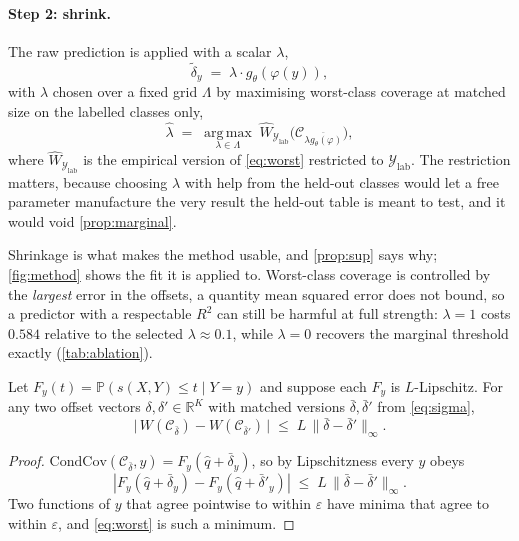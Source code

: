 \paragraph{Step 2: shrink.} The raw prediction is applied with a scalar $\lambda$,
\begin{equation}
\tilde\delta_y \;=\; \lambda\cdot g_\theta(\varphi(y)) ,
\label{eq:shrink}
\end{equation}
with $\lambda$ chosen over a fixed grid $\Lambda$ by maximising worst-class coverage at
matched size on the labelled classes only,
\begin{equation}
\hat\lambda \;=\; \operatorname*{arg\,max}_{\lambda\in\Lambda}\;
\widehat W_{\mathcal{Y}_{\mathrm{lab}}}\bigl(\mathcal{C}_{\overline{\lambda g_\theta(\varphi)}}\bigr),
\label{eq:lambda}
\end{equation}
where $\widehat W_{\mathcal{Y}_{\mathrm{lab}}}$ is the empirical version of \cref{eq:worst}
restricted to $\mathcal{Y}_{\mathrm{lab}}$. The restriction matters, because choosing
$\lambda$ with help from the held-out classes would let a free parameter manufacture the very
result the held-out table is meant to test, and it would void \cref{prop:marginal}.

Shrinkage is what makes the method usable, and \cref{prop:sup} says why;
\cref{fig:method} shows the fit it is applied to. Worst-class
coverage is controlled by the \emph{largest} error in the offsets, a quantity mean squared
error does not bound, so a predictor with a respectable $R^2$ can still be harmful at full
strength: $\lambda=1$ costs $0.584$ relative to the selected $\lambda\approx0.1$, while
$\lambda=0$ recovers the marginal threshold exactly (\cref{tab:ablation}).

\begin{proposition}
\label{prop:sup}
Let $F_y(t)=\mathbb{P}(s(X,Y)\le t\mid Y=y)$ and suppose each $F_y$ is $L$-Lipschitz. For any
two offset vectors $\delta,\delta'\in\mathbb{R}^{K}$ with matched versions
$\bar\delta,\bar\delta'$ from \cref{eq:sigma},
\begin{equation}
\bigl|\,W(\mathcal{C}_{\bar\delta}) - W(\mathcal{C}_{\bar\delta'})\,\bigr|
\;\le\; L\,\bigl\|\bar\delta-\bar\delta'\bigr\|_{\infty}.
\label{eq:supbound}
\end{equation}
\end{proposition}

\begin{proof}
$\mathrm{CondCov}(\mathcal{C}_{\bar\delta},y)=F_y(\hat q+\bar\delta_y)$, so by Lipschitzness every $y$ obeys
\begin{equation}
|F_y(\hat q+\bar\delta_y)-F_y(\hat q+\bar\delta'_y)|
\;\le\; L\,\|\bar\delta-\bar\delta'\|_\infty .
\end{equation} Two functions of $y$ that agree
pointwise to within $\varepsilon$ have minima that agree to within $\varepsilon$, and
\cref{eq:worst} is such a minimum.
\end{proof}

